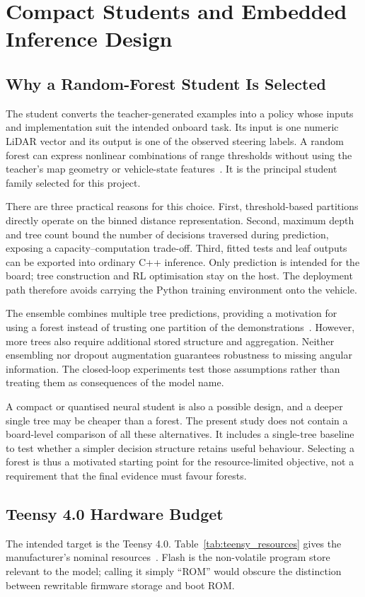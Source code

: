 \chapter{Compact Students and Embedded Inference Design}
\label{ch:student}
\section{Why a Random-Forest Student Is Selected}
The student converts the teacher-generated examples into a policy whose inputs
and implementation suit the intended onboard task. Its input is one numeric
LiDAR vector and its output is one of the observed steering labels. A random
forest can express nonlinear combinations of range thresholds without using
the teacher's map geometry or vehicle-state features~\cite{breiman2001random}.
It is the principal student family selected for this project.

There are three practical reasons for this choice. First, threshold-based
partitions directly operate on the binned distance representation. Second,
maximum depth and tree count bound the number of decisions traversed during
prediction, exposing a capacity--computation trade-off. Third, fitted tests and
leaf outputs can be exported into ordinary C++ inference. Only prediction is
intended for the board; tree construction and RL optimisation stay on the host.
The deployment path therefore avoids carrying the Python training environment
onto the vehicle.

The ensemble combines multiple tree predictions, providing a motivation for
using a forest instead of trusting one partition of the demonstrations~\cite{breiman2001random}.
However, more trees also require additional stored structure and aggregation.
Neither ensembling nor dropout augmentation guarantees robustness to missing
angular information. The closed-loop experiments test those assumptions rather
than treating them as consequences of the model name.

A compact or quantised neural student is also a possible design, and a deeper
single tree may be cheaper than a forest. The present study does not contain
a board-level comparison of all these alternatives. It includes a single-tree
baseline to test whether a simpler decision structure retains useful behaviour.
Selecting a forest is thus a motivated starting point for the resource-limited
objective, not a requirement that the final evidence must favour forests.

\section{Teensy 4.0 Hardware Budget}
The intended target is the Teensy 4.0. Table~\ref{tab:teensy_resources} gives
the manufacturer's nominal resources~\cite{pjrcTeensy40}. Flash is the
non-volatile program store relevant to the model; calling it simply ``ROM''
would obscure the distinction between rewritable firmware storage and boot ROM.

